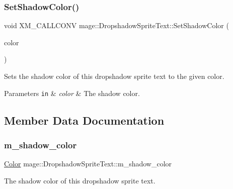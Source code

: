 \subsubsection{\texorpdfstring{Set\+Shadow\+Color()}{SetShadowColor()}\hspace{0.1cm}{\footnotesize\ttfamily [3/3]}}
{\footnotesize\ttfamily void X\+M\+\_\+\+C\+A\+L\+L\+C\+O\+NV mage\+::\+Dropshadow\+Sprite\+Text\+::\+Set\+Shadow\+Color (\begin{DoxyParamCaption}\item[{F\+X\+M\+V\+E\+C\+T\+OR}]{color }\end{DoxyParamCaption})\hspace{0.3cm}{\ttfamily [noexcept]}}

Sets the shadow color of this dropshadow sprite text to the given color.


\begin{DoxyParams}[1]{Parameters}
\mbox{\tt in}  & {\em color} & The shadow color. \\
\hline
\end{DoxyParams}


\subsection{Member Data Documentation}
\hypertarget{classmage_1_1_dropshadow_sprite_text_a6343fd2b2b2139d8a869c29a2a33531f}{}\label{classmage_1_1_dropshadow_sprite_text_a6343fd2b2b2139d8a869c29a2a33531f} 
\subsubsection{\texorpdfstring{m\+\_\+shadow\+\_\+color}{m\_shadow\_color}}
{\footnotesize\ttfamily \hyperlink{structmage_1_1_color}{Color} mage\+::\+Dropshadow\+Sprite\+Text\+::m\+\_\+shadow\+\_\+color\hspace{0.3cm}{\ttfamily [private]}}

The shadow color of this dropshadow sprite text. 